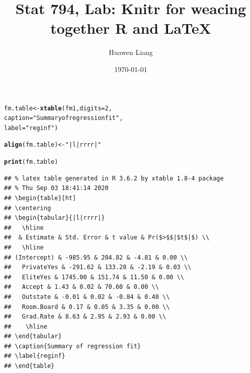 \documentclass{article}\usepackage[]{graphicx}\usepackage[]{color}
\title{Stat 794, Lab: Knitr for weacing together R and LaTeX}
\author{Huawen Liang}
\date{\today}
\makeatletter
\newcommand{\hlnum}[1]{\textcolor[rgb]{0.686,0.059,0.569}{#1}}%
\newcommand{\hlstr}[1]{\textcolor[rgb]{0.192,0.494,0.8}{#1}}%
\newcommand{\hlstd}[1]{\textcolor[rgb]{0.345,0.345,0.345}{#1}}%
\newcommand{\hlkwb}[1]{\textcolor[rgb]{0.69,0.353,0.396}{#1}}%
\newcommand{\hlkwc}[1]{\textcolor[rgb]{0.333,0.667,0.333}{#1}}%
\newcommand{\hlkwd}[1]{\textcolor[rgb]{0.737,0.353,0.396}{\textbf{#1}}}%
\newenvironment{kframe}{%
 \def\at@end@of@kframe{}%
 \ifinner\ifhmode%
  \def\at@end@of@kframe{\end{minipage}}%
  \begin{minipage}{\columnwidth}%
 \fi\fi%
 \def\FrameCommand##1{\hskip\@totalleftmargin \hskip-\fboxsep
 \colorbox{shadecolor}{##1}\hskip-\fboxsep
     \hskip-\linewidth \hskip-\@totalleftmargin \hskip\columnwidth}%
 \MakeFramed {\advance\hsize-\width
   \@totalleftmargin\z@ \linewidth\hsize
   \@setminipage}}%
 {\par\unskip\endMakeFramed%
 \at@end@of@kframe}
\newenvironment{knitrout}{}{} %
\makeatother
\begin{document}
 
\maketitle









\begin{knitrout}
\color{fgcolor}\begin{kframe}
\begin{alltt}
\hlstd{fm.table} \hlkwb{<-} \hlkwd{xtable}\hlstd{(fm1,} \hlkwc{digits}\hlstd{=}\hlnum{2}\hlstd{,}
                   \hlkwc{caption} \hlstd{=} \hlstr{"Summary of regression fit"}\hlstd{,}
                   \hlkwc{label}\hlstd{=}\hlstr{"reginf"}\hlstd{)}

\hlkwd{align}\hlstd{(fm.table)} \hlkwb{<-} \hlstr{"|l|rrrr|"}

\hlkwd{print}\hlstd{(fm.table)}
\end{alltt}
\begin{verbatim}
## % latex table generated in R 3.6.2 by xtable 1.8-4 package
## % Thu Sep 03 18:41:14 2020
## \begin{table}[ht]
## \centering
## \begin{tabular}{|l|rrrr|}
##   \hline
##  & Estimate & Std. Error & t value & Pr($>$$|$t$|$) \\ 
##   \hline
## (Intercept) & -985.95 & 204.82 & -4.81 & 0.00 \\ 
##   PrivateYes & -291.62 & 133.28 & -2.19 & 0.03 \\ 
##   EliteYes & 1745.00 & 151.74 & 11.50 & 0.00 \\ 
##   Accept & 1.43 & 0.02 & 70.60 & 0.00 \\ 
##   Outstate & -0.01 & 0.02 & -0.84 & 0.40 \\ 
##   Room.Board & 0.17 & 0.05 & 3.35 & 0.00 \\ 
##   Grad.Rate & 8.63 & 2.95 & 2.93 & 0.00 \\ 
##    \hline
## \end{tabular}
## \caption{Summary of regression fit} 
## \label{reginf}
## \end{table}
\end{verbatim}
\end{kframe}
\end{knitrout}
\end{document}
